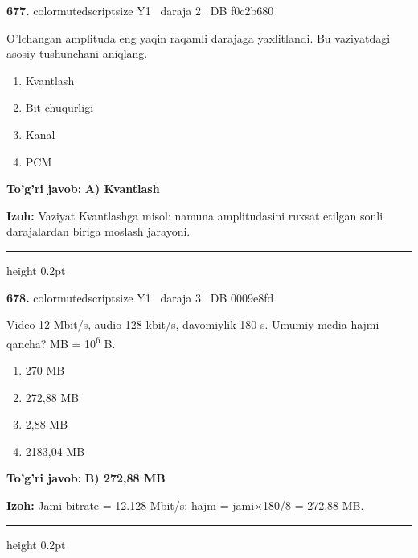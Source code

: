 \documentclass[10pt,a4paper,oneside]{article}
\begin{document}
\noindent\textbf{\color{ink}677.}  {color{muted}scriptsize Y1 \textbullet\ daraja 2 \textbullet\ DB f0c2b680}
\par
O'lchangan amplituda eng yaqin raqamli darajaga yaxlitlandi. Bu vaziyatdagi asosiy tushunchani aniqlang.
\begin{enumerate}[label=\Alph*),leftmargin=9mm]
\item Kvantlash
\item Bit chuqurligi
\item Kanal
\item PCM
\end{enumerate}
\begin{tcolorbox}[enhanced,breakable,colback=teal!4,colframe=teal!50!black,boxrule=0.5pt,arc=1.1mm,left=3mm,right=3mm,top=1.7mm,bottom=1.7mm,before skip=2mm,after skip=2mm]
\textbf{\color{teal}To'g'ri javob:} \textbf{A) Kvantlash}
\par\smallskip
\textbf{Izoh:} Vaziyat Kvantlashga misol: namuna amplitudasini ruxsat etilgan sonli darajalardan biriga moslash jarayoni.
\end{tcolorbox}
\vspace{2mm}\hrule height 0.2pt \vspace{3mm}

\noindent\textbf{\color{ink}678.}  {color{muted}scriptsize Y1 \textbullet\ daraja 3 \textbullet\ DB 0009e8fd}
\par
Video 12 Mbit/s, audio 128 kbit/s, davomiylik 180 s. Umumiy media hajmi qancha? MB = 10\textsuperscript{6} B.
\begin{enumerate}[label=\Alph*),leftmargin=9mm]
\item 270 MB
\item 272,88 MB
\item 2,88 MB
\item 2183,04 MB
\end{enumerate}
\begin{tcolorbox}[enhanced,breakable,colback=teal!4,colframe=teal!50!black,boxrule=0.5pt,arc=1.1mm,left=3mm,right=3mm,top=1.7mm,bottom=1.7mm,before skip=2mm,after skip=2mm]
\textbf{\color{teal}To'g'ri javob:} \textbf{B) 272,88 MB}
\par\smallskip
\textbf{Izoh:} Jami bitrate = 12.128 Mbit/s; hajm = jami\ensuremath{\times}180/8 = 272,88 MB.
\end{tcolorbox}
\vspace{2mm}\hrule height 0.2pt \vspace{3mm}
\end{document}
